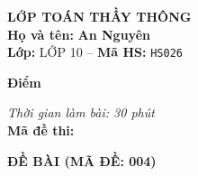 

\noindent
\begin{tcolorbox}[colback=white,colframe=black,arc=0mm,boxrule=0.8pt,top=4pt,bottom=4pt,left=6pt,right=6pt]
	\begin{minipage}[c]{0.44\textwidth}
		{\bfseries\large LỚP TOÁN THẦY THÔNG}\\[3pt]
		\textbf{Họ và tên:} \textbf{\large An Nguyên}\\[3pt]
		\textbf{Lớp:} LỚP 10 \quad -- \quad \textbf{Mã HS:} \texttt{HS026}
	\end{minipage}
	\hfill
	\begin{minipage}[c]{0.22\textwidth}
		\begin{tcolorbox}[colback=white,colframe=black,arc=0mm,boxrule=0.6pt,height=1.8cm,halign=center,valign=top,top=2pt]
			{\bfseries\normalsize Điểm}
		\end{tcolorbox}
	\end{minipage}
	\hfill
	\begin{minipage}[c]{0.30\textwidth}
		\raggedleft
		\textit{Thời gian làm bài: 30 phút}\\[4pt]
		\textbf{Mã đề thi:} 
	\end{minipage}
\end{tcolorbox}
\vspace{0.25cm}

\noindent\textbf{\large ĐỀ BÀI (MÃ ĐỀ: 004)}
\vspace{0.1cm}

